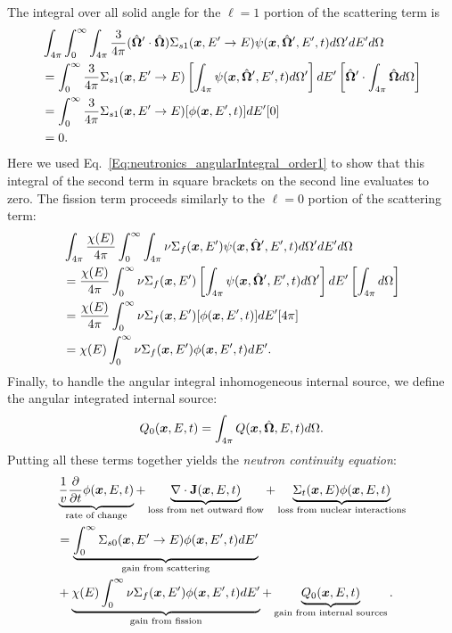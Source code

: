 The integral over all solid angle for the $\ell = 1$ portion of the scattering term is
\begin{align}
  &\int_{4\pi} \int_0^\infty \int_{4\pi}  \frac{3}{4\pi} ( \hat{\mathbf{\Omega}}' \cdot \hat{\mathbf{\Omega}} )  \Sigma_{s1}(\bm{x}, E' \rightarrow E )  \psi(\bm{x},\hat{\mathbf{\Omega}}',E',t) d\Omega' dE' d\Omega \nonumber \\
  &= \int_0^\infty \frac{3}{4\pi} \Sigma_{s1}(\bm{x}, E' \rightarrow E ) \left[ \int_{4\pi}  \psi(\bm{x},\hat{\mathbf{\Omega}}',E',t) d\Omega' \right] dE' \left[  \hat{\mathbf{\Omega}}' \cdot  \int_{4\pi} \hat{\mathbf{\Omega}} d\Omega \right]   \nonumber \\
  &= \int_0^\infty \frac{3}{4\pi} \Sigma_{s1}(\bm{x}, E' \rightarrow E ) [ \phi(\bm{x},E',t) ] dE'  [ 0 ] \nonumber \\
  &= 0 . \nonumber
\end{align}
Here we used Eq.~\eqref{Eq:neutronics_angularIntegral_order1} to show that this integral of the second term in square brackets on the second line evaluates to zero. The fission term proceeds similarly to the $\ell = 0$ portion of the scattering term:
\begin{align}
  &\int_{4\pi} \frac{\chi(E)}{4\pi} \int_0^\infty \int_{4\pi}  \nu \Sigma_f(\bm{x},E') \psi(\bm{x},\hat{\mathbf{\Omega}}',E',t) d\Omega' dE' d\Omega \nonumber \\
  &= \frac{\chi(E)}{4\pi} \int_0^\infty \nu \Sigma_f(\bm{x},E') \left[ \int_{4\pi}  \psi(\bm{x},\hat{\mathbf{\Omega}}',E',t) d\Omega' \right] dE' \left[ \int_{4\pi} d\Omega \right] \nonumber \\
  &= \frac{\chi(E)}{4\pi} \int_0^\infty \nu \Sigma_f(\bm{x},E') [ \phi(\bm{x},E',t) ] dE'  [4\pi ] \nonumber \\
  &= \chi(E) \int_0^\infty \nu \Sigma_f(\bm{x},E') \phi(\bm{x},E',t) dE' . \nonumber
\end{align}
Finally, to handle the angular integral inhomogeneous internal source, we define the angular integrated internal source:
\begin{align}
  Q_0(\bm{x},E,t) = \int_{4\pi} Q(\bm{x},\hat{\mathbf{\Omega}},E,t) d\Omega .
\end{align}
Putting all these terms together yields the \emph{neutron continuity equation}:
\begin{align} \label{Eq:neutronics_neutronDiffusionEquation_timeDependent_labeled}
  & \underbrace{\frac{1}{v} \frac{ \partial {} }{ \partial {t} } \phi(\bm{x},E,t)}_\text{rate of change} 
  + \underbrace{\nabla \cdot \mathbf{J}(\bm{x},E,t)}_\text{loss from net outward flow} 
  + \underbrace{\Sigma_t(\bm{x},E) \phi(\bm{x},E,t)}_\text{loss from nuclear interactions} \nonumber \\*
  &= \underbrace{\int_0^\infty \Sigma_{s0}(\bm{x}, E' \rightarrow E ) \phi(\bm{x},E',t) dE'}_\text{gain from scattering}  \nonumber \\*
  &+ \underbrace{\chi(E) \int_0^\infty \nu \Sigma_f(\bm{x},E') \phi(\bm{x},E',t) dE'}_\text{gain from fission}  
   + \underbrace{Q_0( \bm{x}, E, t )}_\text{gain from internal sources} .
\end{align}
